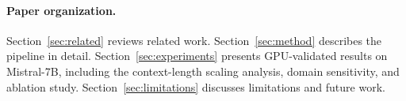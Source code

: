 \paragraph{Paper organization.}
Section~\ref{sec:related} reviews related work.
Section~\ref{sec:method} describes the pipeline in detail.
Section~\ref{sec:experiments} presents GPU-validated results on Mistral-7B,
including the context-length scaling analysis, domain sensitivity, and
ablation study.
Section~\ref{sec:limitations} discusses limitations and future work.
